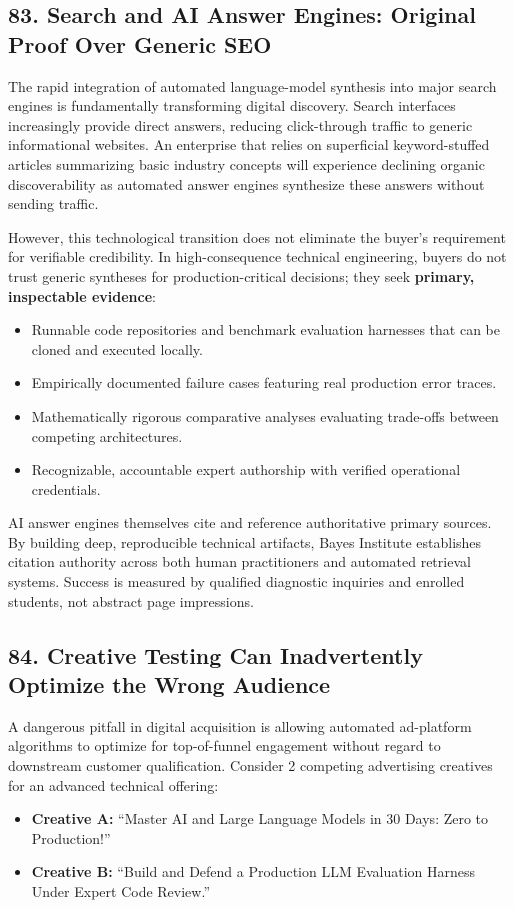 \subsection*{83. Search and AI Answer Engines: Original Proof Over Generic SEO}

The rapid integration of automated language-model synthesis into major search engines is fundamentally transforming digital discovery. Search interfaces increasingly provide direct answers, reducing click-through traffic to generic informational websites. An enterprise that relies on superficial keyword-stuffed articles summarizing basic industry concepts will experience declining organic discoverability as automated answer engines synthesize these answers without sending traffic.

However, this technological transition does not eliminate the buyer's requirement for verifiable credibility. In high-consequence technical engineering, buyers do not trust generic syntheses for production-critical decisions; they seek \textbf{primary, inspectable evidence}:
\begin{itemize}[leftmargin=*,itemsep=1pt]
  \item Runnable code repositories and benchmark evaluation harnesses that can be cloned and executed locally.
  \item Empirically documented failure cases featuring real production error traces.
  \item Mathematically rigorous comparative analyses evaluating trade-offs between competing architectures.
  \item Recognizable, accountable expert authorship with verified operational credentials.
\end{itemize}

AI answer engines themselves cite and reference authoritative primary sources. By building deep, reproducible technical artifacts, Bayes Institute establishes citation authority across both human practitioners and automated retrieval systems. Success is measured by qualified diagnostic inquiries and enrolled students, not abstract page impressions.

\subsection*{84. Creative Testing Can Inadvertently Optimize the Wrong Audience}

A dangerous pitfall in digital acquisition is allowing automated ad-platform algorithms to optimize for top-of-funnel engagement without regard to downstream customer qualification. Consider 2 competing advertising creatives for an advanced technical offering:
\begin{itemize}[leftmargin=*,itemsep=1pt]
  \item \textbf{Creative A:} ``Master AI and Large Language Models in 30 Days: Zero to Production!''
  \item \textbf{Creative B:} ``Build and Defend a Production LLM Evaluation Harness Under Expert Code Review.''
\end{itemize}

